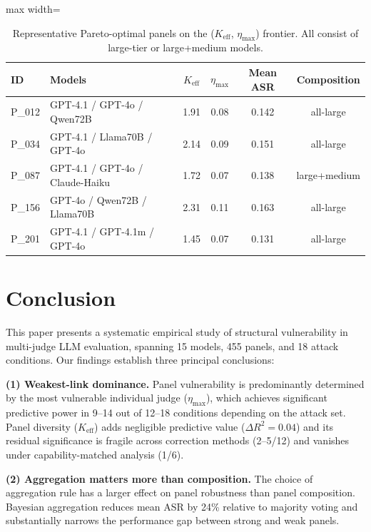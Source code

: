 \documentclass[11pt,a4paper]{article}
\begin{document}
\begin{table}[t]
\centering
\caption{Representative Pareto-optimal panels on the ($K_{\mathrm{eff}}$, $\eta_{\max}$) frontier. All consist of large-tier or large+medium models.}
\label{tab:pareto}
\small
\begin{adjustbox}{max width=\textwidth}
\begin{tabular}{llcccc}
\toprule
\textbf{ID} & \textbf{Models} & $K_{\mathrm{eff}}$ & $\eta_{\max}$ & \textbf{Mean ASR} & \textbf{Composition} \\
\midrule
P\_012 & GPT-4.1 / GPT-4o / Qwen72B & 1.91 & 0.08 & 0.142 & all-large \\
P\_034 & GPT-4.1 / Llama70B / GPT-4o & 2.14 & 0.09 & 0.151 & all-large \\
P\_087 & GPT-4.1 / GPT-4o / Claude-Haiku & 1.72 & 0.07 & 0.138 & large+medium \\
P\_156 & GPT-4o / Qwen72B / Llama70B & 2.31 & 0.11 & 0.163 & all-large \\
P\_201 & GPT-4.1 / GPT-4.1m / GPT-4o & 1.45 & 0.07 & 0.131 & all-large \\
\bottomrule
\end{tabular}
\end{adjustbox}
\end{table}

\section{Conclusion}
\label{sec:conclusion}

This paper presents a systematic empirical study of structural vulnerability in multi-judge LLM evaluation, spanning 15 models, 455 panels, and 18 attack conditions.
Our findings establish three principal conclusions:

\textbf{(1) Weakest-link dominance.}
Panel vulnerability is predominantly determined by the most vulnerable individual judge ($\eta_{\max}$), which achieves significant predictive power in 9--14 out of 12--18 conditions depending on the attack set.
Panel diversity ($K_{\mathrm{eff}}$) adds negligible predictive value ($\Delta R^2 = 0.04$) and its residual significance is fragile across correction methods (2--5/12) and vanishes under capability-matched analysis (1/6).

\textbf{(2) Aggregation matters more than composition.}
The choice of aggregation rule has a larger effect on panel robustness than panel composition.
Bayesian aggregation reduces mean ASR by 24\% relative to majority voting and substantially narrows the performance gap between strong and weak panels.
\end{document}
